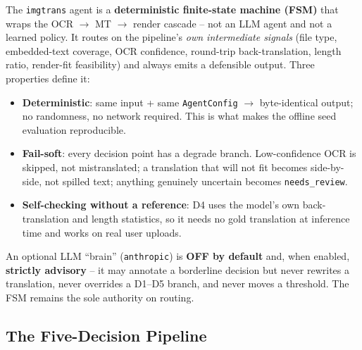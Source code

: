 \documentclass[12pt,a4paper]{article}
\begin{document}
The \texttt{imgtrans} agent is a \textbf{deterministic finite-state machine (FSM)} that wraps the OCR $\rightarrow$ MT $\rightarrow$ render cascade -- not an LLM agent and not a learned policy. It routes on the pipeline's \emph{own intermediate signals} (file type, embedded-text coverage, OCR confidence, round-trip back-translation, length ratio, render-fit feasibility) and always emits a defensible output. Three properties define it:

\begin{itemize}\setlength\itemsep{0.15em}
  \item \textbf{Deterministic}: same input + same \texttt{AgentConfig} $\rightarrow$ byte-identical output; no randomness, no network required. This is what makes the offline seed evaluation reproducible.
  \item \textbf{Fail-soft}: every decision point has a degrade branch. Low-confidence OCR is skipped, not mistranslated; a translation that will not fit becomes side-by-side, not spilled text; anything genuinely uncertain becomes \texttt{needs\_review}.
  \item \textbf{Self-checking without a reference}: D4 uses the model's own back-translation and length statistics, so it needs no gold translation at inference time and works on real user uploads.
\end{itemize}

An optional LLM ``brain'' (\texttt{anthropic}) is \textbf{OFF by default} and, when enabled, \textbf{strictly advisory} -- it may annotate a borderline decision but never rewrites a translation, never overrides a D1--D5 branch, and never moves a threshold. The FSM remains the sole authority on routing.

\subsection{The Five-Decision Pipeline}
\end{document}
